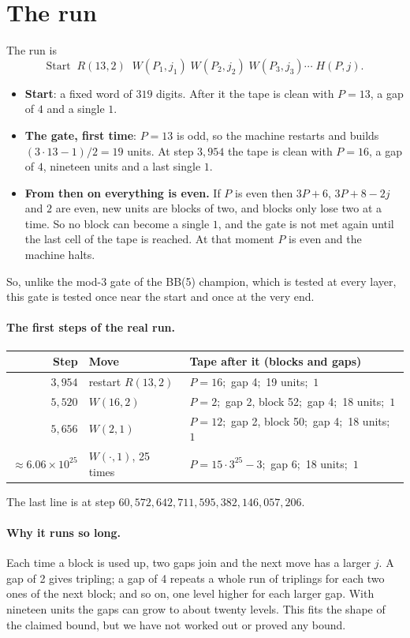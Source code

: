 \documentclass[11pt]{article}
\theoremstyle{remark}
\begin{document}
\section{The run}

The run is
\[
\text{Start}\;\; R(13,2)\;\; W(P_1,j_1)\; W(P_2,j_2)\; W(P_3,j_3)\cdots\; H(P,j).
\]
\begin{itemize}
\item \textbf{Start}: a fixed word of $319$ digits. After it the tape is clean
with $P=13$, a gap of $4$ and a single $1$.
\item \textbf{The gate, first time}: $P=13$ is odd, so the machine restarts and
builds $(3\cdot13-1)/2=19$ units. At step $3{,}954$ the tape is clean with
$P=16$, a gap of $4$, nineteen units and a last single $1$.
\item \textbf{From then on everything is even.} If $P$ is even then $3P+6$,
$3P+8-2j$ and $2$ are even, new units are blocks of two, and blocks only lose
two at a time. So no block can become a single $1$, and the gate is not met
again until the last cell of the tape is reached. At that moment $P$ is even
and the machine halts.
\end{itemize}
So, unlike the mod-3 gate of the BB(5) champion, which is tested at every
layer, this gate is tested once near the start and once at the very end.

\paragraph{The first steps of the real run.}
\begin{center}
\begin{tabular}{rll}
\toprule
Step & Move & Tape after it (blocks and gaps)\\
\midrule
$3{,}954$ & restart $R(13,2)$ & $P=16$;\ gap 4;\ 19 units;\ $1$\\
$5{,}520$ & $W(16,2)$ & $P=2$;\ gap 2, block 52;\ gap 4;\ 18 units;\ $1$\\
$5{,}656$ & $W(2,1)$ & $P=12$;\ gap 2, block 50;\ gap 4;\ 18 units;\ $1$\\
$\approx 6.06\times10^{25}$ & $W(\cdot,1)$, 25 times & $P=15\cdot3^{25}-3$;\ gap 6;\ 18 units;\ $1$\\
\bottomrule
\end{tabular}
\end{center}
The last line is at step $60{,}572{,}642{,}711{,}595{,}382{,}146{,}057{,}206$.

\paragraph{Why it runs so long.} Each time a block is used up, two gaps join
and the next move has a larger $j$. A gap of 2 gives tripling; a gap of 4
repeats a whole run of triplings for each two ones of the next block; and so
on, one level higher for each larger gap. With nineteen units the gaps can grow
to about twenty levels. This fits the shape of the claimed bound, but we have
not worked out or proved any bound.
\end{document}
